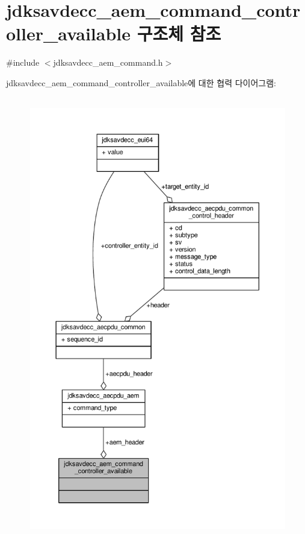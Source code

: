 \hypertarget{structjdksavdecc__aem__command__controller__available}{}\section{jdksavdecc\+\_\+aem\+\_\+command\+\_\+controller\+\_\+available 구조체 참조}
\label{structjdksavdecc__aem__command__controller__available}


{\ttfamily \#include $<$jdksavdecc\+\_\+aem\+\_\+command.\+h$>$}



jdksavdecc\+\_\+aem\+\_\+command\+\_\+controller\+\_\+available에 대한 협력 다이어그램\+:
\nopagebreak
\begin{figure}[H]
\begin{center}
\leavevmode
\includegraphics[height=550pt]{structjdksavdecc__aem__command__controller__available__coll__graph}
\end{center}
\end{figure}

